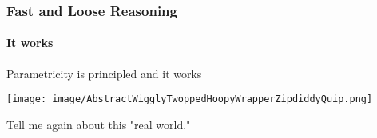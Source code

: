 \begin{frame}[fragile]
\frametitle{Fast and Loose Reasoning}
\framesubtitle{It works}
\begin{center}
Parametricity is principled and it works
\end{center}
\begin{center}
\texttt{[image: image/AbstractWigglyTwoppedHoopyWrapperZipdiddyQuip.png]}
\end{center}
\begin{center}
Tell me again about this "real world." 
\end{center}
\end{frame}
